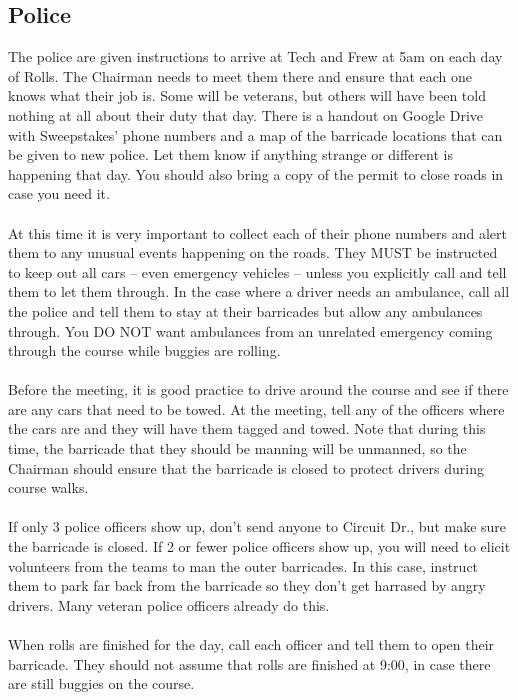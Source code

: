 \subsection{Police}
The police are given instructions to arrive at Tech and Frew at 5am on each
day of Rolls. The Chairman needs to meet them there and ensure that each one
knows what their job is. Some will be veterans, but others will have been
told nothing at all about their duty that day. There is a handout on Google
Drive with Sweepstakes' phone numbers and a map of the barricade locations
that can be given to new police. Let them know if anything strange or different
is happening that day. You should also bring a copy of the
permit to close roads in case you need it.
\\\\
At this time it is very important to collect each of their phone numbers
and alert them to any unusual events happening on the roads. They MUST
be instructed to keep out all cars -- even emergency vehicles -- unless you
explicitly call and tell them to let them through. In the case where a driver
needs an ambulance, call all the police and tell them to stay at their
barricades but allow any ambulances through. You DO NOT want ambulances from
an unrelated emergency coming through the course while buggies are rolling.
\\\\
Before the meeting, it is good practice to drive around the course and see
if there are any cars that need to be towed. At the meeting, tell any of
the officers where the cars are and they will have them tagged and towed.
Note that during this time, the barricade that they should be manning will be
unmanned, so the Chairman should ensure that the barricade is closed to
protect drivers during course walks.
\\\\
If only 3 police officers show up, don't send anyone to Circuit Dr., but
make sure the barricade is closed. If 2 or fewer police officers show up,
you will need to elicit volunteers from the teams to man the outer barricades.
In this case, instruct them to park far back from the barricade so they don't
get harrased by angry drivers. Many veteran police officers already do this.
\\\\
When rolls are finished for the day, call each officer and tell them to open
their barricade. They should not assume that rolls are finished at 9:00,
in case there are still buggies on the course.

